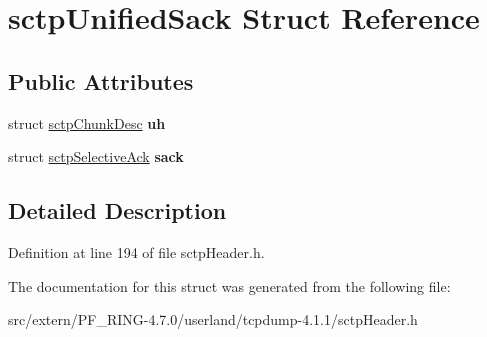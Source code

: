 \hypertarget{structsctp_unified_sack}{
\section{sctpUnifiedSack Struct Reference}
\label{structsctp_unified_sack}
}
\subsection*{Public Attributes}
\begin{DoxyCompactItemize}
\item 
\hypertarget{structsctp_unified_sack_abb7937960054c9a814bbbd69ad6792d1}{
struct \hyperlink{structsctp_chunk_desc}{sctpChunkDesc} {\bfseries uh}}
\label{structsctp_unified_sack_abb7937960054c9a814bbbd69ad6792d1}

\item 
\hypertarget{structsctp_unified_sack_a91e17108eecda04b45c1fa2ae7e6afe5}{
struct \hyperlink{structsctp_selective_ack}{sctpSelectiveAck} {\bfseries sack}}
\label{structsctp_unified_sack_a91e17108eecda04b45c1fa2ae7e6afe5}

\end{DoxyCompactItemize}


\subsection{Detailed Description}


Definition at line 194 of file sctpHeader.h.



The documentation for this struct was generated from the following file:\begin{DoxyCompactItemize}
\item 
src/extern/PF\_\-RING-\/4.7.0/userland/tcpdump-\/4.1.1/sctpHeader.h\end{DoxyCompactItemize}
